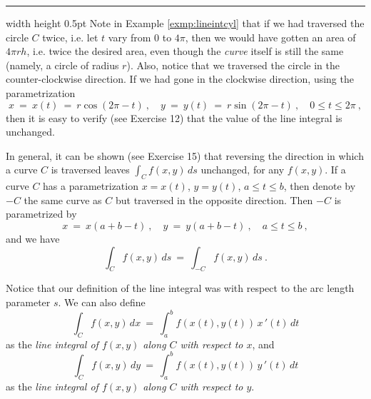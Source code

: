 \hrule width \textwidth height 0.5pt
\newpage
Note in Example \ref{exmp:lineintcyl} that if we had traversed the circle $C$ twice, i.e. let $t$ vary from $0$
to $4\pi$, then we would have gotten an area of $4\pi r h$, i.e. twice the desired area, even though the \emph{curve}
itself is still the same (namely, a circle of radius $r$). Also, notice that we traversed the circle in the
counter-clockwise direction. If we had gone in the clockwise direction, using the parametrization
\begin{equation}\label{eqn:lineintcylcwise}
 x ~=~ x(t) ~=~ r \cos (2\pi - t) ~,\quad y ~=~ y(t) ~=~ r \sin (2\pi - t)~,\quad 0 \le t \le 2\pi ~,
\end{equation}
then it is easy to verify (see Exercise 12) that the value of the line integral is unchanged.

In general, it can be shown
(see Exercise 15) that reversing the direction in which a curve $C$ is traversed leaves $\int_C f(x,y)\,ds$ unchanged,
for any $f(x,y)$. If a curve $C$ has a parametrization $x=x(t)$, $y=y(t)$, $a \le t \le b$, then denote by $-C$ the
same curve as $C$ but traversed in the opposite direction. Then $-C$ is parametrized by
\begin{equation}\label{eqn:reversec}
 x ~=~ x(a+b-t)~,\quad y ~=~ y(a+b-t)~,\quad a \le t \le b ~,
\end{equation}
and we have
\begin{equation}
 \int_C f(x,y)\,ds ~=~ \int_{-C} f(x,y)\,ds ~.
\end{equation}

Notice that our definition of the line integral was with respect to the arc length parameter $s$. We can also
define
\begin{equation}\label{eqn:lineintx2}
 \int_C f(x,y)\,dx ~=~ \int_a^b f(x(t),y(t)) \,x\,'(t)\,dt
\end{equation}
as the \emph{line integral of $f(x,y)$ along $C$ with respect to $x$}, and
\begin{equation}\label{eqn:lineinty2}
 \int_C f(x,y)\,dy ~=~ \int_a^b f(x(t),y(t)) \,y\,'(t)\,dt
\end{equation}
as the \emph{line integral of $f(x,y)$ along $C$ with respect to $y$}.

